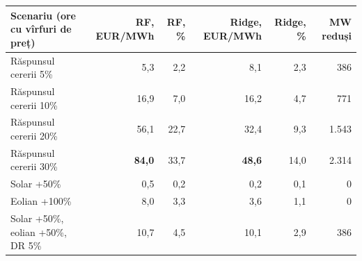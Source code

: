 \begin{tabular}{lrrrrr}
\toprule
Scenariu (ore cu vîrfuri de preț) & RF, EUR/MWh & RF, \% & Ridge, EUR/MWh & Ridge, \% & MW reduși \\
\midrule
Răspunsul cererii 5\% & 5,3 & 2,2 & 8,1 & 2,3 & 386 \\
Răspunsul cererii 10\% & 16,9 & 7,0 & 16,2 & 4,7 & 771 \\
Răspunsul cererii 20\% & 56,1 & 22,7 & 32,4 & 9,3 & 1.543 \\
Răspunsul cererii 30\% & \textbf{84,0} & 33,7 & \textbf{48,6} & 14,0 & 2.314 \\
Solar +50\% & 0,5 & 0,2 & 0,2 & 0,1 & 0 \\
Eolian +100\% & 8,0 & 3,3 & 3,6 & 1,1 & 0 \\
Solar +50\%, eolian +50\%, DR 5\% & 10,7 & 4,5 & 10,1 & 2,9 & 386 \\
\bottomrule
\end{tabular}
